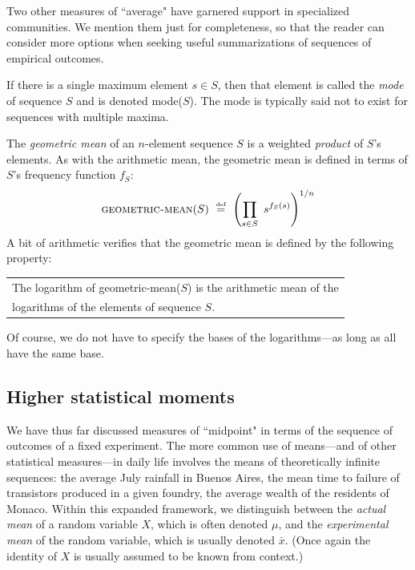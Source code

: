 Two other measures of ``average" have garnered support in specialized communities.  We mention them just for completeness, so that the reader can consider more options when seeking useful summarizations of sequences of empirical outcomes.

\medskip

 

\noindent
If there is a single maximum element $s \in S$, then that element is called the {\em mode} of sequence $S$ and is denoted {\sc mode}($S$).  The mode is typically said not to exist for sequences with multiple maxima.

\medskip

   

\noindent
The {\it geometric mean} of an $n$-element sequence $S$ is a weighted {\em product} of $S$'s elements.  As with the arithmetic mean, the geometric mean is defined in terms of $S$'s frequency function $f_S$:
\[ \mbox{\sc geometric-mean}(S) \ \stackrel{\mbox{{\tiny def}}}{=} \  \left(\prod_{s \in S} \ s^{f_S(s)} \right)^{1/n} \]
A bit of arithmetic verifies that the geometric mean is defined by the following property:

\smallskip

{\em 
\begin{tabular}{l}
The logarithm of {\sc geometric-mean}($S$) is the arithmetic mean of the \\
logarithms of the elements of sequence $S$.
\end{tabular}
}

\smallskip

\noindent
Of course, we do not have to specify the bases of the logarithms---as long as all have the same base.
 
\subsection{Higher statistical moments}
\label{sec:mean-plus-moments}


We have thus far discussed measures of ``midpoint" in terms of the sequence of outcomes of a fixed experiment.  The more common use of means---and of other statistical measures---in daily life involves the means of theoretically infinite sequences: the average July rainfall in Buenos Aires, the mean time to failure of transistors produced in a given foundry, the average wealth of the residents of Monaco.  Within this expanded framework, we distinguish between the {\em actual mean} of a random variable $X$, which is often denoted $\mu$, and the {\em experimental mean} of the random variable, which is usually denoted $\bar{x}$.  (Once again the identity of $X$ is usually assumed to be known from context.)

